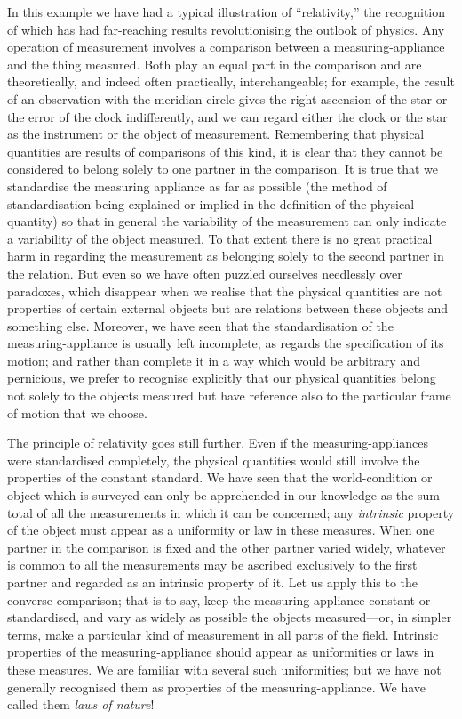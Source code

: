 \documentclass[12pt]{book}
\begin{document}
In this example we have had a typical illustration of ``relativity,'' the
%
recognition of which has had far\hyp{}reaching results revolutionising the outlook
of physics. Any operation of measurement involves a comparison between
a measuring\hyp{}appliance and the thing measured. Both play an equal part in
the comparison and are theoretically, and indeed often practically, interchangeable;
for example, the result of an observation with the meridian circle
gives the right ascension of the star or the error of the clock indifferently,
and we can regard either the clock or the star as the instrument or the
object of measurement. Remembering that physical quantities are results of
comparisons of this kind, it is clear that they cannot be considered to belong
solely to one partner in the comparison. It is true that we standardise the
measuring appliance as far as possible (the method of standardisation being
explained or implied in the definition of the physical quantity) so that in
general the variability of the measurement can only indicate a variability of
the object measured. To that extent there is no great practical harm in
regarding the measurement as belonging solely to the second partner in
the relation. But even so we have often puzzled ourselves needlessly over
paradoxes, which disappear when we realise that the physical quantities are
not properties of certain external objects but are relations between these
objects and something else. Moreover, we have seen that the standardisation
of the measuring\hyp{}appliance is usually left incomplete, as regards the specification
of its motion; and rather than complete it in a way which would be
arbitrary and pernicious, we prefer to recognise explicitly that our physical
quantities belong not solely to the objects measured but have reference also
to the particular frame of motion that we choose.

The principle of relativity goes still further. Even if the measuring\hyp{}appliances
were standardised completely, the physical quantities would still
involve the properties of the constant standard. We have seen that the
world\hyp{}condition or object which is surveyed can only be apprehended in our
knowledge as the sum total of all the measurements in which it can be
concerned; any \emph{intrinsic} property of the object must appear as a uniformity
or law in these measures. When one partner in the comparison is fixed and
the other partner varied widely, whatever is common to all the measurements
may be ascribed exclusively to the first partner and regarded as an intrinsic
property of it. Let us apply this to the converse comparison; that is to say,
keep the measuring\hyp{}appliance constant or standardised, and vary as widely
as possible the objects measured---or, in simpler terms, make a particular
kind of measurement in all parts of the field. Intrinsic properties of the
measuring\hyp{}appliance should appear as uniformities or laws in these measures.
We are familiar with several such uniformities; but we have not generally
recognised them as properties of the measuring\hyp{}appliance. We have called
them \emph{laws of nature}!
\end{document}
